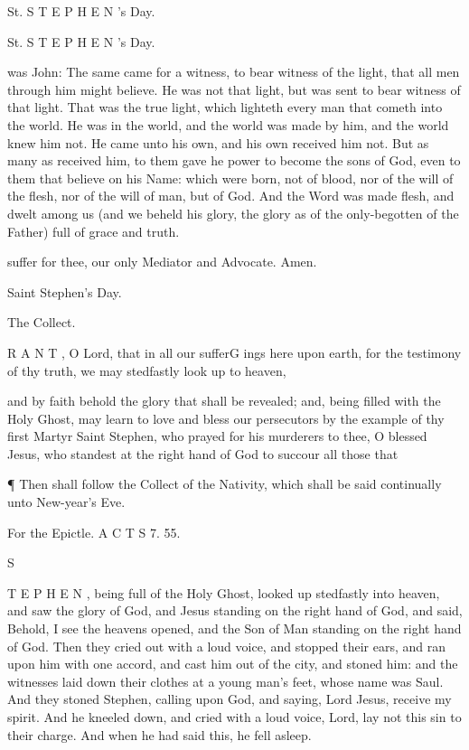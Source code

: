 St. S T E P H E N ’s Day.

St. S T E P H E N ’s Day.

was John: The same came for a witness, to bear witness of the light, that all men through him might believe. He was not that light, but was sent to bear witness of that light. That was the true light, which lighteth every man that cometh into the world. He was in the world, and the world was made by him, and the world knew him not. He came unto his own, and his own received him not. But as many as received him, to them gave he power to become the sons of God, even to them that believe on his Name: which were born, not of blood, nor of the will of the flesh, nor of the will of man, but of God. And the Word was made flesh, and dwelt among us (and we beheld his glory, the glory as of the only-begotten of the Father) full of grace and truth.

suffer for thee, our only Mediator and Advocate. Amen.

Saint Stephen's Day.

The Collect.

R A N T , O Lord, that in all our sufferG ings here upon earth, for the testimony of thy truth, we may stedfastly look up to heaven,

and by faith behold the glory that shall be revealed; and, being filled with the Holy Ghost, may learn to love and bless our persecutors by the example of thy first Martyr Saint Stephen, who prayed for his murderers to thee, O blessed Jesus, who standest at the right hand of God to succour all those that

¶ Then shall follow the Collect of the Nativity, which shall be said continually unto New-year's Eve.

For the Epictle. A C T S 7. 55.

S

T E P H E N , being full of the Holy Ghost, looked up stedfastly into heaven, and saw the glory of God, and Jesus standing on the right hand of God, and said, Behold, I see the heavens opened, and the Son of Man standing on the right hand of God. Then they cried out with a loud voice, and stopped their ears, and ran upon him with one accord, and cast him out of the city, and stoned him: and the witnesses laid down their clothes at a young man's feet, whose name was Saul. And they stoned Stephen, calling upon God, and saying, Lord Jesus, receive my spirit. And he kneeled down, and cried with a loud voice, Lord, lay not this sin to their charge. And when he had said this, he fell asleep.


